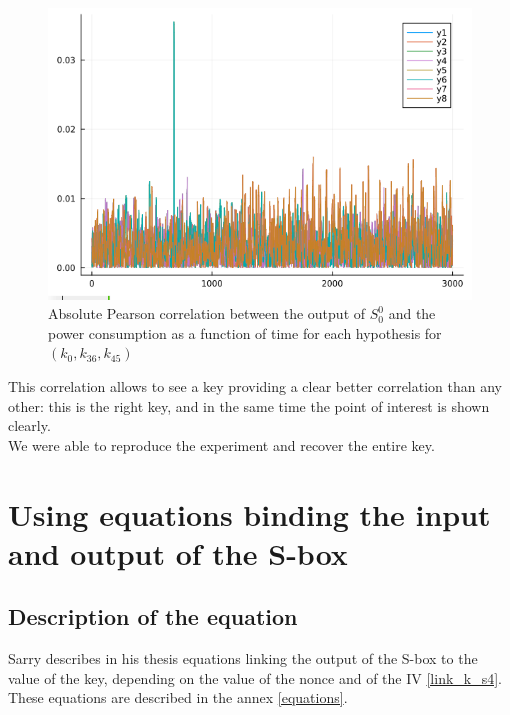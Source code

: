 \documentclass[a4paper,11pt,twocolumn]{article}
\begin{document}
		\begin{figure}[h]
			\centering
			\includegraphics[scale=0.3]{graph_daemen}
			\caption{Absolute Pearson correlation between the output of $S_0^0$ and the power consumption as a function of time for each hypothesis for $(k_0,k_{36},k_{45})$}
			\label{graphs}
		\end{figure}
		
		This correlation allows to see a key providing a clear better correlation than any other: this is the right key, and in the same time the point of interest is shown clearly.\\
		We were able to reproduce the experiment and recover the entire key.
		
		
		\section{Using equations binding the input and output of the S-box}
		\subsection{Description of the equation} \label{sec_equ}
		Sarry \cite{these} describes in his thesis equations linking the output of the S-box to the value of the key, depending on the value of the nonce and of the IV \ref{link_k_s4}. These equations are described in the annex \ref{equations}.
		
\end{document}
